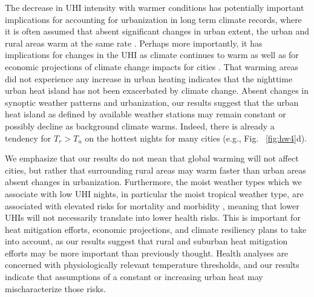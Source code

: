 {The decrease in UHI intensity with warmer conditions has potentially important implications for accounting for urbanization in long term climate records, where it is often assumed that absent significant changes in urban extent, the urban and rural areas warm at the same rate \citep{hausfather2013quantifying,stone2012managing}.  Perhaps more importantly, it has implications for changes in the UHI as climate continues to warm as well as for economic projections of climate change impacts for cities \citep{estrada2017global}. 
That warming areas did not experience any increase in urban heating indicates that the nighttime urban heat island has not been exacerbated by climate change.  Absent changes in synoptic weather patterns and urbanization, our results suggest that the urban heat island as defined by available weather stations may remain constant or possibly decline as background climate warms. Indeed, there is already a tendency for $T_r > T_u$ on the hottest nights for many cities (e.g., Fig. ~\ref{fig:hw4}d).

We emphasize that our results do not mean that global warming will not affect cities, but rather that surrounding rural areas may warm faster than urban areas absent changes in urbanization.
Furthermore, the moist weather types which we associate with low UHI nights, in particular the moist tropical weather type, are associated with elevated risks for mortality and morbidity  \citep{sheridan2004progress}, meaning that lower UHIs will not necessarily translate into lower health risks. 
This is important for heat mitigation efforts, economic projections, and climate resiliency plans to take into account, as our results suggest that rural and suburban heat mitigation efforts may be more important than previously thought. Health analyses are concerned with physiologically relevant temperature thresholds, and our results indicate that assumptions of a constant or increasing urban heat may mischaracterize those risks.   


}
